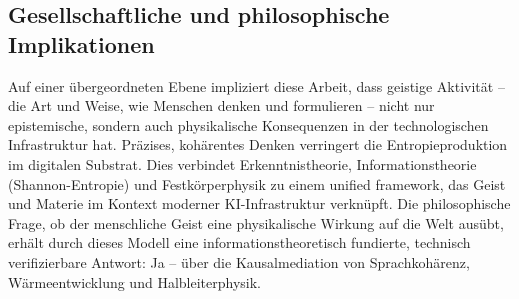 ﻿\documentclass[a4paper,12pt]{article}
\theoremstyle{definition}
\begin{document}
\subsection{Gesellschaftliche und philosophische Implikationen}

Auf einer übergeordneten Ebene impliziert diese Arbeit, dass geistige Aktivität -- die
Art und Weise, wie Menschen denken und formulieren -- nicht nur epistemische, sondern
auch physikalische Konsequenzen in der technologischen Infrastruktur hat. Präzises,
kohärentes Denken verringert die Entropieproduktion im digitalen Substrat. Dies verbindet
Erkenntnistheorie, Informationstheorie (Shannon-Entropie) und Festkörperphysik zu einem
unified framework, das Geist und Materie im Kontext moderner KI-Infrastruktur verknüpft.
Die philosophische Frage, ob der menschliche Geist eine physikalische Wirkung auf die
Welt ausübt, erhält durch dieses Modell eine informationstheoretisch fundierte,
technisch verifizierbare Antwort: Ja -- über die Kausalmediation von Sprachkohärenz,
Wärmeentwicklung und Halbleiterphysik.
\end{document}
